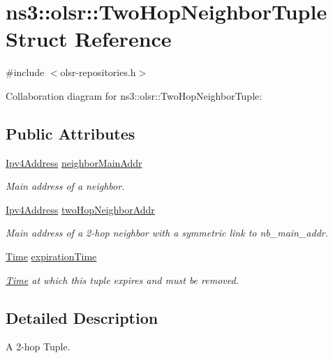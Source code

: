 \hypertarget{structns3_1_1olsr_1_1TwoHopNeighborTuple}{}\section{ns3\+:\+:olsr\+:\+:Two\+Hop\+Neighbor\+Tuple Struct Reference}
\label{structns3_1_1olsr_1_1TwoHopNeighborTuple}


{\ttfamily \#include $<$olsr-\/repositories.\+h$>$}



Collaboration diagram for ns3\+:\+:olsr\+:\+:Two\+Hop\+Neighbor\+Tuple\+:
\subsection*{Public Attributes}
\begin{DoxyCompactItemize}
\item 
\hyperlink{classns3_1_1Ipv4Address}{Ipv4\+Address} \hyperlink{structns3_1_1olsr_1_1TwoHopNeighborTuple_a98657858d62fdc2fe9beb30bfb16a56f}{neighbor\+Main\+Addr}
\begin{DoxyCompactList}\small\item\em Main address of a neighbor. \end{DoxyCompactList}\item 
\hyperlink{classns3_1_1Ipv4Address}{Ipv4\+Address} \hyperlink{structns3_1_1olsr_1_1TwoHopNeighborTuple_a24f8a8ff95423260d2a1e1b0e39b98e8}{two\+Hop\+Neighbor\+Addr}
\begin{DoxyCompactList}\small\item\em Main address of a 2-\/hop neighbor with a symmetric link to nb\+\_\+main\+\_\+addr. \end{DoxyCompactList}\item 
\hyperlink{classns3_1_1Time}{Time} \hyperlink{structns3_1_1olsr_1_1TwoHopNeighborTuple_ab703c9b62bd85f870b56b51d9e5ce9bb}{expiration\+Time}
\begin{DoxyCompactList}\small\item\em \hyperlink{classns3_1_1Time}{Time} at which this tuple expires and must be removed. \end{DoxyCompactList}\end{DoxyCompactItemize}


\subsection{Detailed Description}
A 2-\/hop Tuple. 

